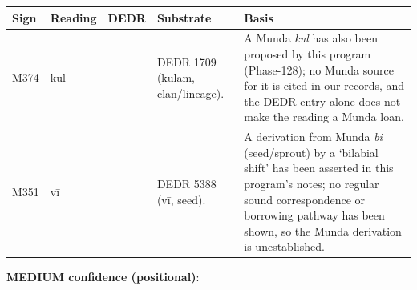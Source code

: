 \documentclass[
]{article}
\newcounter{none} %
\begin{document}
{\def\LTcaptype{none} %
\begin{longtable}[]{@{}
  >{\raggedright\arraybackslash}p{}
  >{\raggedright\arraybackslash}p{}
  >{\raggedright\arraybackslash}p{}
  >{\raggedright\arraybackslash}p{}
  >{\raggedright\arraybackslash}p{}@{}}
\toprule\noalign{}
\begin{minipage}[b]{\linewidth}\raggedright
Sign
\end{minipage} & \begin{minipage}[b]{\linewidth}\raggedright
Reading
\end{minipage} & \begin{minipage}[b]{\linewidth}\raggedright
DEDR
\end{minipage} & \begin{minipage}[b]{\linewidth}\raggedright
Substrate
\end{minipage} & \begin{minipage}[b]{\linewidth}\raggedright
Basis
\end{minipage} \\
\midrule\noalign{}
\endhead
\bottomrule\noalign{}
\endlastfoot
M374 & kul & 1709 & DEDR 1709 (kulam, clan/lineage). & A Munda \emph{kul} has also been proposed by this program (Phase-128); no Munda source for it is cited in our records, and the DEDR entry alone does not make the reading a Munda loan. \\
M351 & vī & 5388 & DEDR 5388 (vī, seed). & A derivation from Munda \emph{bi} (seed/sprout) by a `bilabial shift' has been asserted in this program's notes; no regular sound correspondence or borrowing pathway has been shown, so the Munda derivation is unestablished. \\
\end{longtable}
}

\textbf{MEDIUM confidence (positional)}:
\end{document}
